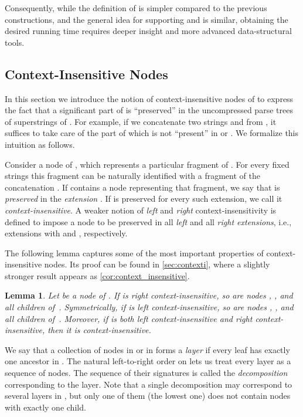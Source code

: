 \documentclass[a4paper]{article}
\newtheorem{lemma}[theorem]{Lemma}
\theoremstyle{remark}
\begin{document}
Consequently, while the definition of  is simpler compared to  the previous constructions,
and the general idea for supporting  and  is similar,
obtaining the desired running time requires deeper insight and more advanced data-structural tools.

\newcommand{\itstring}{\mathit{pref}}
\newcommand{\itsuf}{\mathit{suff}}

\subsection{Context-Insensitive Nodes}\label{sec:context_short}
In this section we introduce the notion of context-insensitive nodes of  to express
the fact that a significant part of  is ``preserved'' in the uncompressed parse trees of superstrings of .
For example, if we concatenate two strings  and  from , it suffices to take care of the part of  
which is not ``present'' in  or . We formalize this intuition as follows.

Consider a node  of , which represents a particular fragment  of .
For every fixed strings  this fragment can be naturally identified with a fragment of the concatenation .
If  contains a node representing that fragment, we say that  is \emph{preserved} in the \emph{extension} .
If  is preserved for every such extension, we call it \emph{context-insensitive}.
A weaker notion of \emph{left} and \emph{right} context-insensitivity is defined to impose a node
to be preserved in  all \emph{left} and all \emph{right extensions},  i.e., extensions with  and , respectively.

The following lemma captures some of the most important properties of context-insensitive nodes.
Its proof can be found in \cref{sec:contexti}, where a slightly stronger result appears as \cref{cor:context_insensitive}.

\begin{lemma}\label{lem:context_insensitive} Let  be a node of .
  If  is right context-insensitive, so are nodes , , and all children of~.
  Symmetrically, if  is left context-insensitive, so are nodes , , and all children of~.
Moreover, if  is both left context-insensitive and right context-insensitive, then it is context-insensitive.
\end{lemma}

We say that a collection  of nodes in  or in  forms a \emph{layer} if every leaf has exactly one ancestor in .
The natural left-to-right order on  lets us treat every layer as a sequence of nodes.
The sequence of their signatures is called the \emph{decomposition} corresponding to the layer.
Note that a single decomposition may correspond to several layers in , but only one of them (the lowest one) does not contain nodes with exactly one child.
\end{document}
